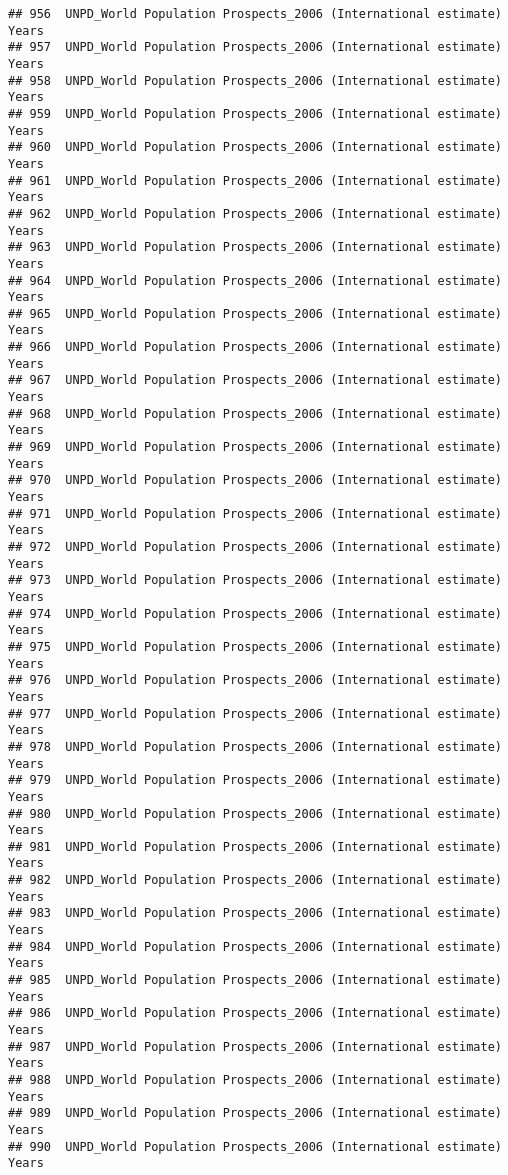 \documentclass[]{article}
\begin{document}
\begin{verbatim}
## 956  UNPD_World Population Prospects_2006 (International estimate) Years
## 957  UNPD_World Population Prospects_2006 (International estimate) Years
## 958  UNPD_World Population Prospects_2006 (International estimate) Years
## 959  UNPD_World Population Prospects_2006 (International estimate) Years
## 960  UNPD_World Population Prospects_2006 (International estimate) Years
## 961  UNPD_World Population Prospects_2006 (International estimate) Years
## 962  UNPD_World Population Prospects_2006 (International estimate) Years
## 963  UNPD_World Population Prospects_2006 (International estimate) Years
## 964  UNPD_World Population Prospects_2006 (International estimate) Years
## 965  UNPD_World Population Prospects_2006 (International estimate) Years
## 966  UNPD_World Population Prospects_2006 (International estimate) Years
## 967  UNPD_World Population Prospects_2006 (International estimate) Years
## 968  UNPD_World Population Prospects_2006 (International estimate) Years
## 969  UNPD_World Population Prospects_2006 (International estimate) Years
## 970  UNPD_World Population Prospects_2006 (International estimate) Years
## 971  UNPD_World Population Prospects_2006 (International estimate) Years
## 972  UNPD_World Population Prospects_2006 (International estimate) Years
## 973  UNPD_World Population Prospects_2006 (International estimate) Years
## 974  UNPD_World Population Prospects_2006 (International estimate) Years
## 975  UNPD_World Population Prospects_2006 (International estimate) Years
## 976  UNPD_World Population Prospects_2006 (International estimate) Years
## 977  UNPD_World Population Prospects_2006 (International estimate) Years
## 978  UNPD_World Population Prospects_2006 (International estimate) Years
## 979  UNPD_World Population Prospects_2006 (International estimate) Years
## 980  UNPD_World Population Prospects_2006 (International estimate) Years
## 981  UNPD_World Population Prospects_2006 (International estimate) Years
## 982  UNPD_World Population Prospects_2006 (International estimate) Years
## 983  UNPD_World Population Prospects_2006 (International estimate) Years
## 984  UNPD_World Population Prospects_2006 (International estimate) Years
## 985  UNPD_World Population Prospects_2006 (International estimate) Years
## 986  UNPD_World Population Prospects_2006 (International estimate) Years
## 987  UNPD_World Population Prospects_2006 (International estimate) Years
## 988  UNPD_World Population Prospects_2006 (International estimate) Years
## 989  UNPD_World Population Prospects_2006 (International estimate) Years
## 990  UNPD_World Population Prospects_2006 (International estimate) Years

\end{verbatim}
\end{document}
